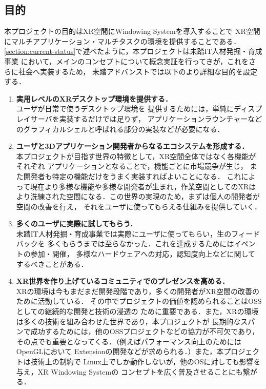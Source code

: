 \subsection{目的}
\label{section:objective}

本プロジェクトの目的はXR空間にWindowing Systemを導入することで
XR空間にマルチアプリケーション・マルチタスクの環境を提供することである．
\ref{section:current-status}で述べたように，本プロジェクトは未踏IT人材発掘・育成事業
において，メインのコンセプトについて概念実証を行ってきが，これをさらに社会へ実装するため，
未踏アドバンストでは以下のより詳細な目的を設定する．

\begin{enumerate}
  \item \textbf{実用レベルのXRデスクトップ環境を提供する．}\\
        ユーザが日常で使うデスクトップ環境を
        提供するためには，単純にディスプレイサーバを実装するだけでは足りず，
        アプリケーションラウンチャーなどのグラフィカルシェルと呼ばれる部分の実装などが必要になる．
  \item \textbf{ユーザと3Dアプリケーション開発者からなるエコシステムを形成する．}\\ %
        本プロジェクトが目指す世界の特徴として，XR空間全体ではなく各機能がそれぞれ
        アプリケーションとなることで，機能ごとに市場競争が生じ，
        また開発者も特定の機能だけをうまく実装すればよいことになる．
        これによって現在より多様な機能や多様な開発者が生まれ，作業空間としてのXRは
        より洗練された空間になる．この世界の実現のため，まずは個人の開発者が空間の改善を行え，
        それをユーザに使ってもらえる仕組みを提供していく．
  \item \textbf{多くのユーザに実際に試してもらう．}\\
        未踏IT人材発掘・育成事業では実際にユーザに使ってもらい，生のフィードバックを
        多くもらうまでは至らなかった．これを達成するためにはイベントの参加・開催，
        多様なハードウェアへの対応，認知度向上などに関してするべきことがある．
  \item \textbf{XR世界を作り上げているコミュニティでのプレゼンスを高める．}\\
        XRの環境は今もまだまだ開発段階であり，多くの開発者がXR空間の改善のために活動している．
        その中でプロジェクトの価値を認められることはOSSとしての継続的な開発と技術の浸透の
        ために重要である．また，XRの環境は多くの技術を組み合わせた世界であり，本プロジェクトが
        長期的なスパンで成功するためには，他のOSSプロジェクトなどの協力が不可欠であり，
        その点でも重要となってくる．（例えばパフォーマンス向上のためにはOpenGLにおいて
        Extensionの開発などが求められる．）また，本プロジェクトは技術上の制約で
        Linux上でしか動作しないが，他のOSに対しても影響を与え，XR Windowing Systemの
        コンセプトを広く普及させることにも繋がる．
\end{enumerate}
